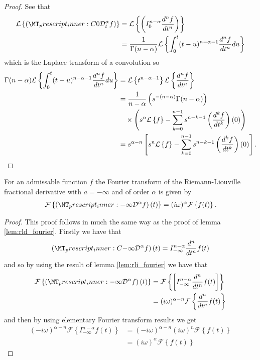 \begin{proof}
    See that
    \begin{align}
        \laplace{\capder{0}{t}{\alpha}{f}} &= \laplace{  \rli{0}{n-\alpha}{\der{f}{t}{n}}} \\
            &= \frac{1}{\Gamma(n-\alpha)}\laplace{ \int_0^t (t-u)^{n-\alpha-1} \der{f}{t}{n} du} \\ 
    \end{align}
    which is the Laplace transform of a convolution so
    \begin{align}
        \Gamma(n-\alpha)\mathcal{L} \left\{  \int_0^t (t-u)^{n-\alpha-1} \frac{d^{n}f}{dt^{n}} du \right\} &= \mathcal{L} \left\{ t^{n-\alpha-1} \right\} \mathcal{L} \left\{ \frac{d^{n}f}{dt^{n}} \right\} \\
        &= \frac{1}{n-\alpha} \left( s^{-(n-\alpha)} \Gamma(n-\alpha) \right) \\
        & \ \ \ \times \left( s^n \mathcal{L} \left\{ f \right\} - \sum_{k=0}^{n-1} s^{n-k-1} \left( \frac{d^{k}f}{dt^{k}} \right)(0) \right) \\
        &= s^{\alpha - n} \left[ s^n \mathcal{L} \left\{ f \right\} - \sum_{k=0}^{n-1} s^{n-k-1} \left( \frac{d^{k}f}{dt^{k}} \right)(0) \right].
    \end{align}
\end{proof}
\begin{mdframed}[innertopmargin=10pt]
\begin{lemma}
    \label{lem:cap_fourier}
    For an admissable function $ f $ the Fourier transform of the Riemann-Liouville fractional derivative with $ a = -\infty $ and of order $ \alpha $ is given by
    \begin{align}
        \mathcal{F}\left\{ \left(\prescript{}{-\infty}{\mathcal{D}}^\alpha f\right)(t) \right\} = (i\omega)^{\alpha} \mathcal{F}\left\{ f(t) \right\}.
    \end{align}
\end{lemma}
\end{mdframed}
\begin{proof}
This proof follows in much the same way as the proof of lemma \ref{lem:rld_fourier}.
Firstly we have that
    \begin{align}
        \left(\prescript{C}{-\infty}{\mathcal{D}}^\alpha f\right)(t) =  I_{-\infty}^{n - \alpha} \frac{d^n}{dt^n}f(t)
    \end{align}
    and so by using the result of lemma \ref{lem:rli_fourier} we have that
    \begin{align}
        \mathcal{F}\left\{ \left(\prescript{}{-\infty}{\mathcal{D}}^\alpha f\right)(t) \right\}  &=
        \mathcal{F}\left\{ \left[ I_{-\infty}^{n-\alpha} \frac{d^n}{dt^n}f(t) \right] \right\} \\
        &= (i\omega)^{\alpha - n} \mathcal{F}\left\{ \frac{d^n}{dt^n}f(t) \right\}
    \end{align}
    and then by using elementary Fourier transform results we get
    \begin{align}
        (-i\omega)^{\alpha -n} \mathcal{F}\left\{ I_{-\infty}^{n-\alpha} f(t) \right\} &= (-i\omega)^{\alpha - n}(i\omega)^{n}\mathcal{F}\left\{ f(t)\right\} \\
        &= (i\omega)^\alpha  \mathcal{F}\left\{ f(t) \right\}
    \end{align}
\end{proof}
